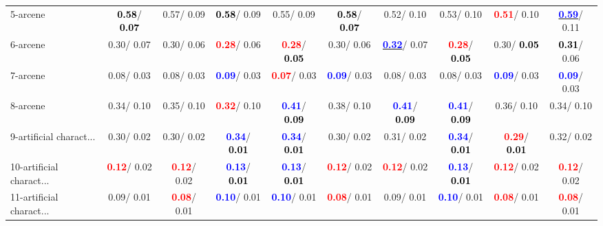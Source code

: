 \begin{table}[h]
\begin{center}
{\begin{tabular}{lc|c|c|c|c|c|c|c|c}
5-arcene & \textcolor{black}{\textbf{  0.58}}/\textcolor{black}{\textbf{  0.07}} &   0.57/  0.09 & \textcolor{black}{\textbf{  0.58}}/  0.09 &   0.55/  0.09 & \textcolor{black}{\textbf{  0.58}}/\textcolor{black}{\textbf{  0.07}} &   0.52/  0.10 &   0.53/  0.10 & \textcolor{red}{\textbf{  0.51}}/  0.10 & \underline{\textcolor{blue}{\textbf{  0.59}}}/  0.11 \\
6-arcene &   0.30/  0.07 &   0.30/  0.06 & \textcolor{red}{\textbf{  0.28}}/  0.06 & \textcolor{red}{\textbf{  0.28}}/\textcolor{black}{\textbf{  0.05}} &   0.30/  0.06 & \underline{\textcolor{blue}{\textbf{  0.32}}}/  0.07 & \textcolor{red}{\textbf{  0.28}}/\textcolor{black}{\textbf{  0.05}} &   0.30/\textcolor{black}{\textbf{  0.05}} & \textcolor{black}{\textbf{  0.31}}/  0.06 \\
7-arcene &   0.08/  0.03 &   0.08/  0.03 & \textcolor{blue}{\textbf{  0.09}}/  0.03 & \textcolor{red}{\textbf{  0.07}}/  0.03 & \textcolor{blue}{\textbf{  0.09}}/  0.03 &   0.08/  0.03 &   0.08/  0.03 & \textcolor{blue}{\textbf{  0.09}}/  0.03 & \textcolor{blue}{\textbf{  0.09}}/  0.03 \\ \hline
8-arcene &   0.34/  0.10 &   0.35/  0.10 & \textcolor{red}{\textbf{  0.32}}/  0.10 & \textcolor{blue}{\textbf{  0.41}}/\textcolor{black}{\textbf{  0.09}} &   0.38/  0.10 & \textcolor{blue}{\textbf{  0.41}}/\textcolor{black}{\textbf{  0.09}} & \textcolor{blue}{\textbf{  0.41}}/\textcolor{black}{\textbf{  0.09}} &   0.36/  0.10 &   0.34/  0.10 \\
9-artificial charact... &   0.30/  0.02 &   0.30/  0.02 & \textcolor{blue}{\textbf{  0.34}}/\textcolor{black}{\textbf{  0.01}} & \textcolor{blue}{\textbf{  0.34}}/\textcolor{black}{\textbf{  0.01}} &   0.30/  0.02 &   0.31/  0.02 & \textcolor{blue}{\textbf{  0.34}}/\textcolor{black}{\textbf{  0.01}} & \textcolor{red}{\textbf{  0.29}}/\textcolor{black}{\textbf{  0.01}} &   0.32/  0.02 \\
10-artificial charact... & \textcolor{red}{\textbf{  0.12}}/  0.02 & \textcolor{red}{\textbf{  0.12}}/  0.02 & \textcolor{blue}{\textbf{  0.13}}/\textcolor{black}{\textbf{  0.01}} & \textcolor{blue}{\textbf{  0.13}}/\textcolor{black}{\textbf{  0.01}} & \textcolor{red}{\textbf{  0.12}}/  0.02 & \textcolor{red}{\textbf{  0.12}}/  0.02 & \textcolor{blue}{\textbf{  0.13}}/\textcolor{black}{\textbf{  0.01}} & \textcolor{red}{\textbf{  0.12}}/  0.02 & \textcolor{red}{\textbf{  0.12}}/  0.02 \\
11-artificial charact... &   0.09/  0.01 & \textcolor{red}{\textbf{  0.08}}/  0.01 & \textcolor{blue}{\textbf{  0.10}}/  0.01 & \textcolor{blue}{\textbf{  0.10}}/  0.01 & \textcolor{red}{\textbf{  0.08}}/  0.01 &   0.09/  0.01 & \textcolor{blue}{\textbf{  0.10}}/  0.01 & \textcolor{red}{\textbf{  0.08}}/  0.01 & \textcolor{red}{\textbf{  0.08}}/  0.01 \\

\end{tabular}}
\end{center}
\end{table}
